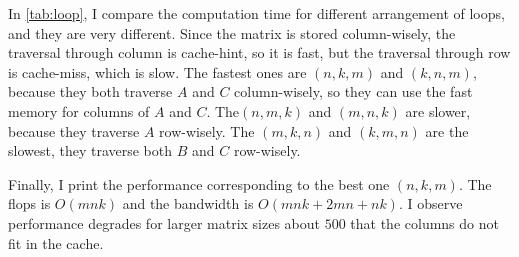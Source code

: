 \documentclass[10pt,a4paper]{article}
\theoremstyle{dotlessP}
\begin{document}
In \cref{tab:loop}, I compare the computation time for different arrangement of loops, and they are very different.  Since the matrix is stored column-wisely, the traversal through column is cache-hint, so it is fast, but the traversal through row is cache-miss, which is slow. The fastest ones are $(n,k,m)$ and $(k,n,m)$, because they both traverse $A$ and $C$ column-wisely, so they can use the fast memory for columns of $A$ and $C$. The$(n,m,k)$ and $(m,n,k)$ are slower, because they traverse $A$ row-wisely. The $(m,k,n)$ and $(k,m,n)$ are the slowest, they traverse both $B$ and $C$ row-wisely.

Finally, I print the performance corresponding to the best one $(n,k,m)$. The flops is $O(mnk)$ and the bandwidth is $O(mnk+2mn+nk)$. I observe performance degrades for larger matrix sizes about $500$ that the columns do not fit in the cache.
\end{document}
